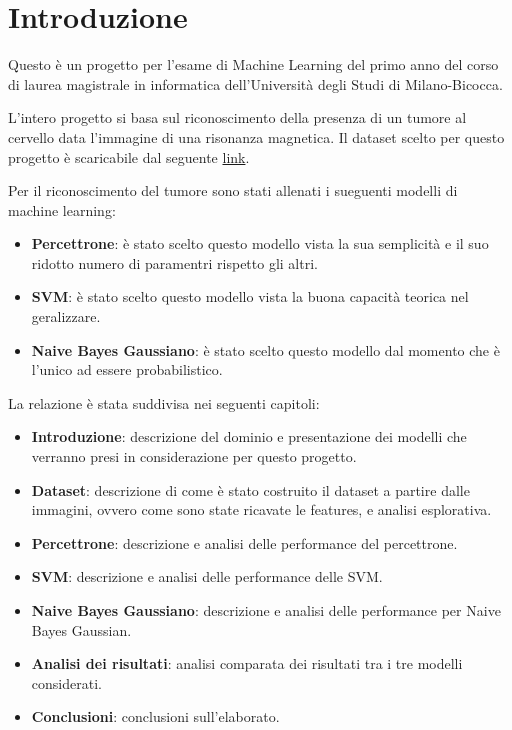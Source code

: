 \chapter{Introduzione}

Questo è un progetto per l'esame di Machine Learning del primo anno del corso 
di laurea magistrale in informatica dell'Università degli Studi di Milano-Bicocca.

L'intero progetto si basa sul riconoscimento della presenza di un tumore al cervello
data l'immagine di una risonanza magnetica. Il dataset scelto per questo progetto
è scaricabile dal seguente \href{URLhttps://www.kaggle.com/datasets/jakeshbohaju/brain-tumor/data}{link}.

Per il riconoscimento del tumore sono stati allenati i sueguenti modelli di machine
learning:
\begin{itemize}
    \item \textbf{Percettrone}: è stato scelto questo modello vista la sua semplicità
    e il suo ridotto numero di paramentri rispetto gli altri.
    \item \textbf{SVM}: è stato scelto questo modello vista la buona capacità
    teorica nel geralizzare.
    \item \textbf{Naive Bayes Gaussiano}: è stato scelto questo modello dal momento
    che è l'unico ad essere probabilistico.
\end{itemize}

La relazione è stata suddivisa nei seguenti capitoli:
\begin{itemize}
    \item \textbf{Introduzione}: descrizione del dominio e presentazione dei modelli che 
    verranno presi in considerazione per questo progetto.
    \item \textbf{Dataset}: descrizione di come è stato costruito il dataset a partire
    dalle immagini, ovvero come sono state ricavate le features, e analisi esplorativa.
    \item \textbf{Percettrone}: descrizione e analisi delle performance del percettrone.
    \item \textbf{SVM}: descrizione e analisi delle performance delle SVM.
    \item \textbf{Naive Bayes Gaussiano}: descrizione e analisi delle performance 
    per Naive Bayes Gaussian.
    \item \textbf{Analisi dei risultati}: analisi comparata dei risultati tra i 
    tre modelli considerati.
    \item \textbf{Conclusioni}: conclusioni sull'elaborato.
\end{itemize}